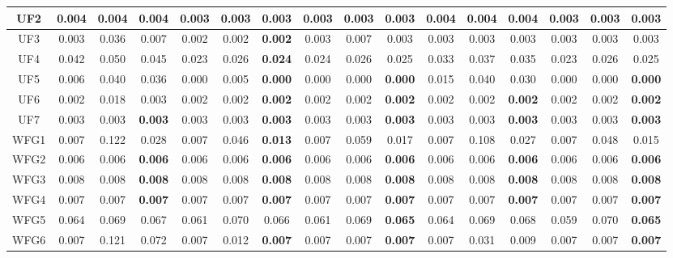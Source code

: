 \begin{table}[H]
{\begin{tabular}{c|c|c|c|c|c|c|c|c|c|c|c|c|c|c|c|}
\multicolumn{1}{|c|}{UF2} & 0.004 & 0.004 & 0.004 & 0.003 & 0.003 & \textbf{0.003} & 0.003 & 0.003 & \textbf{0.003} & 0.004 & 0.004 & 0.004 & 0.003 & 0.003 & \textbf{0.003} \\ \hline
\multicolumn{1}{|c|}{UF3} & 0.003 & 0.036 & 0.007 & 0.002 & 0.002 & \textbf{0.002} & 0.003 & 0.007 & 0.003 & 0.003 & 0.003 & 0.003 & 0.003 & 0.003 & 0.003 \\ \hline
\multicolumn{1}{|c|}{UF4} & 0.042 & 0.050 & 0.045 & 0.023 & 0.026 & \textbf{0.024} & 0.024 & 0.026 & 0.025 & 0.033 & 0.037 & 0.035 & 0.023 & 0.026 & 0.025 \\ \hline
\multicolumn{1}{|c|}{UF5} & 0.006 & 0.040 & 0.036 & 0.000 & 0.005 & \textbf{0.000} & 0.000 & 0.000 & \textbf{0.000} & 0.015 & 0.040 & 0.030 & 0.000 & 0.000 & \textbf{0.000} \\ \hline
\multicolumn{1}{|c|}{UF6} & 0.002 & 0.018 & 0.003 & 0.002 & 0.002 & \textbf{0.002} & 0.002 & 0.002 & \textbf{0.002} & 0.002 & 0.002 & \textbf{0.002} & 0.002 & 0.002 & \textbf{0.002} \\ \hline
\multicolumn{1}{|c|}{UF7} & 0.003 & 0.003 & \textbf{0.003} & 0.003 & 0.003 & \textbf{0.003} & 0.003 & 0.003 & \textbf{0.003} & 0.003 & 0.003 & \textbf{0.003} & 0.003 & 0.003 & \textbf{0.003} \\ \hline
\multicolumn{1}{|c|}{WFG1} & 0.007 & 0.122 & 0.028 & 0.007 & 0.046 & \textbf{0.013} & 0.007 & 0.059 & 0.017 & 0.007 & 0.108 & 0.027 & 0.007 & 0.048 & 0.015 \\ \hline
\multicolumn{1}{|c|}{WFG2} & 0.006 & 0.006 & \textbf{0.006} & 0.006 & 0.006 & \textbf{0.006} & 0.006 & 0.006 & \textbf{0.006} & 0.006 & 0.006 & \textbf{0.006} & 0.006 & 0.006 & \textbf{0.006} \\ \hline
\multicolumn{1}{|c|}{WFG3} & 0.008 & 0.008 & \textbf{0.008} & 0.008 & 0.008 & \textbf{0.008} & 0.008 & 0.008 & \textbf{0.008} & 0.008 & 0.008 & \textbf{0.008} & 0.008 & 0.008 & \textbf{0.008} \\ \hline
\multicolumn{1}{|c|}{WFG4} & 0.007 & 0.007 & \textbf{0.007} & 0.007 & 0.007 & \textbf{0.007} & 0.007 & 0.007 & \textbf{0.007} & 0.007 & 0.007 & \textbf{0.007} & 0.007 & 0.007 & \textbf{0.007} \\ \hline
\multicolumn{1}{|c|}{WFG5} & 0.064 & 0.069 & 0.067 & 0.061 & 0.070 & 0.066 & 0.061 & 0.069 & \textbf{0.065} & 0.064 & 0.069 & 0.068 & 0.059 & 0.070 & \textbf{0.065} \\ \hline
\multicolumn{1}{|c|}{WFG6} & 0.007 & 0.121 & 0.072 & 0.007 & 0.012 & \textbf{0.007} & 0.007 & 0.007 & \textbf{0.007} & 0.007 & 0.031 & 0.009 & 0.007 & 0.007 & \textbf{0.007} \\ \hline

\end{tabular}}
\end{table}
